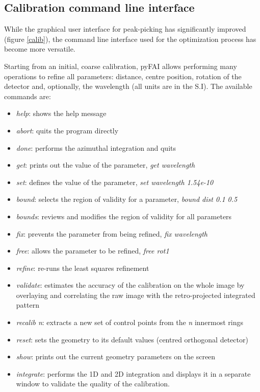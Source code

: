 \documentclass[preprint]{iucr}
\begin{document}
\subsection{Calibration command line interface}

While the graphical user interface for peak-picking has significantly improved
(figure \ref{calib}), the command line interface used for the optimization
process has become more versatile.

Starting from an initial, coarse calibration, pyFAI allows performing many
operations to refine all parameters: distance, centre position, rotation of
the detector and, optionally, the wavelength (all units are in the S.I).
The available commands are:
\begin{itemize}
\item \textit{help}: shows the help message
\item \textit{abort}: quits the program directly
\item \textit{done}: performs the azimuthal integration and quits
\item \textit{get}: prints out the value of the parameter, \textit{get
wavelength}
\item \textit{set}: defines the value of the parameter, \textit{set wavelength
1.54e-10}
\item \textit{bound}: selects the region of validity for a parameter,
\textit{bound dist 0.1 0.5}
\item \textit{bounds}: reviews and modifies the region of validity for all
parameters
\item \textit{fix}: prevents the parameter from being refined, \textit{fix
wavelength}
\item \textit{free}: allows the parameter to be refined, \textit{free rot1}
\item \textit{refine}: re-runs the least squares refinement
\item \textit{validate}: estimates the accuracy of the calibration on
the whole image by overlaying and correlating the raw image with the
retro-projected integrated pattern
\item \textit{recalib n}: extracts a new set of control points from the
\textit{n} innermost rings
\item \textit{reset}: sets the geometry to its default values (centred
orthogonal detector)
\item \textit{show}: prints out the current geometry parameters on the screen
\item \textit{integrate}: performs the 1D and 2D integration and displays it in
a separate window to validate the quality of the calibration.
\end{itemize}
\end{document}
